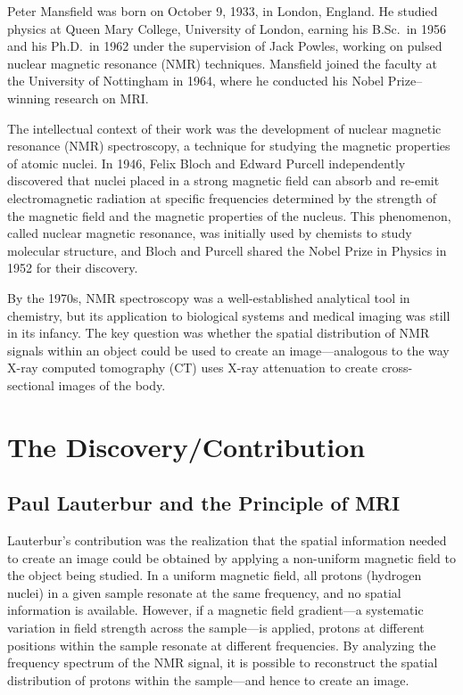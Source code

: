 Peter Mansfield was born on October 9, 1933, in London, England. He studied physics at Queen Mary College, University of London, earning his B.Sc.\ in 1956 and his Ph.D.\ in 1962 under the supervision of Jack Powles, working on pulsed nuclear magnetic resonance (NMR) techniques. Mansfield joined the faculty at the University of Nottingham in 1964, where he conducted his Nobel Prize--winning research on MRI.

The intellectual context of their work was the development of nuclear magnetic resonance (NMR) spectroscopy, a technique for studying the magnetic properties of atomic nuclei. In 1946, Felix Bloch and Edward Purcell independently discovered that nuclei placed in a strong magnetic field can absorb and re-emit electromagnetic radiation at specific frequencies determined by the strength of the magnetic field and the magnetic properties of the nucleus. This phenomenon, called nuclear magnetic resonance, was initially used by chemists to study molecular structure, and Bloch and Purcell shared the Nobel Prize in Physics in 1952 for their discovery.

By the 1970s, NMR spectroscopy was a well-established analytical tool in chemistry, but its application to biological systems and medical imaging was still in its infancy. The key question was whether the spatial distribution of NMR signals within an object could be used to create an image---analogous to the way X-ray computed tomography (CT) uses X-ray attenuation to create cross-sectional images of the body.

\section{The Discovery/Contribution}

\subsection{Paul Lauterbur and the Principle of MRI}

Lauterbur's contribution was the realization that the spatial information needed to create an image could be obtained by applying a non-uniform magnetic field to the object being studied. In a uniform magnetic field, all protons (hydrogen nuclei) in a given sample resonate at the same frequency, and no spatial information is available. However, if a magnetic field gradient---a systematic variation in field strength across the sample---is applied, protons at different positions within the sample resonate at different frequencies. By analyzing the frequency spectrum of the NMR signal, it is possible to reconstruct the spatial distribution of protons within the sample---and hence to create an image.

